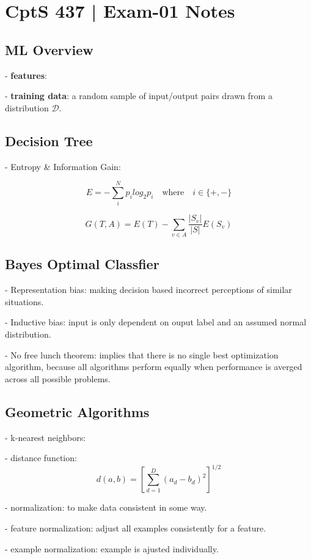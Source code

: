 \documentclass[12pt,letterpaper]{article}
\begin{document}

\section*{CptS 437 | Exam-01 Notes }
\;
\subsection*{ML Overview}
- \textbf{features}:

- \textbf{training data}: a random sample of input/output pairs drawn from a
distribution $\mathcal{D}$.
\;
\subsection*{Decision Tree}
- Entropy \& Information Gain:

\[ E = -\sum_{i}^{N}p_ilog_2p_i \quad \mbox{where} \quad i \in \{+, -\}\]

\[ G(T, A) = E(T) - \displaystyle\sum_{v {\in} A}\frac{|S_v|}{|S|}E(S_v) \]

\subsection*{Bayes Optimal Classfier}

- Representation bias: making decision based incorrect perceptions of similar
situations.

- Inductive bias: input is only dependent on ouput label and an assumed normal
distribution.

- No free lunch theorem: implies that there is no single best optimization
algorithm, because all algorithms perform equally when performance is averged
across all possible problems.

\subsection*{Geometric Algorithms}

- k-nearest neighbors:

- distance function:
    \[d(a,b) = \left[ \displaystyle\sum_{d=1}^{D}
(a_d-b_d)^2 \right]^{1/2}\]

- normalization: to make data consistent in some way.

    - feature normalization: adjust all examples consistently for a feature.
    
    - example normalization: example is ajusted individually.
\end{document}
